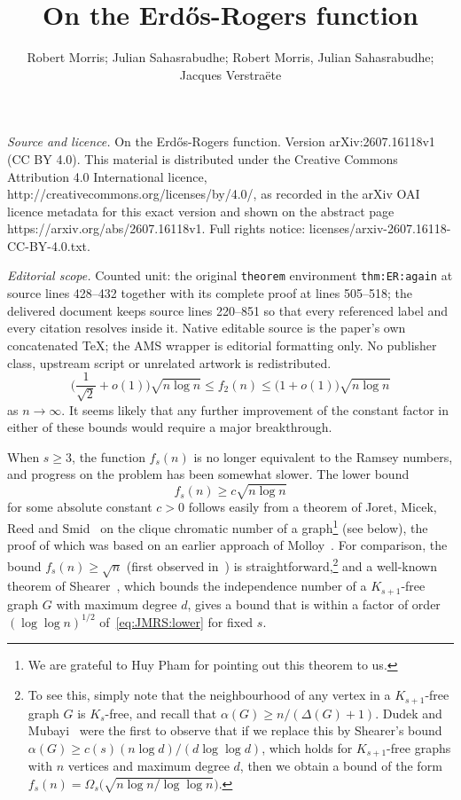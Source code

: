\documentclass[10pt,a4paper]{amsart}
\numberwithin{theorem}{section}
\renewcommand{\(}{\bigl(}
\renewcommand{\)}{\bigr)\vphantom{)}}
\renewcommand{\le}{\leqslant}
\renewcommand{\ge}{\geqslant}
\begin{document}
\title[On the ErdHos-Rogers function]{On the Erd\H{o}s-Rogers function}
\author{Robert Morris; Julian Sahasrabudhe; Robert Morris, Julian Sahasrabudhe; Jacques Verstraëte}
\date{}
\maketitle
\noindent\emph{Source and licence.} On the Erd\H{o}s-Rogers function. Version arXiv:2607.16118v1 (CC BY 4.0). This material is distributed under the Creative Commons Attribution 4.0 International licence, http://creativecommons.org/licenses/by/4.0/, as recorded in the arXiv OAI licence metadata for this exact version and shown on the abstract page https://arxiv.org/abs/2607.16118v1. Full rights notice: licenses/arxiv-2607.16118-CC-BY-4.0.txt.\par\smallskip
\noindent\textit{Editorial scope.} Counted unit: the original \texttt{theorem} environment \texttt{thm:ER:again} at source lines 428--432 together with its complete proof at lines 505--518; the delivered document keeps source lines 220--851 so that every referenced label and every citation resolves inside it. Native editable source is the paper's own concatenated TeX; the AMS wrapper is editorial formatting only. No publisher class, upstream script or unrelated artwork is redistributed.
\begin{equation}\label{eq:R3k:bounds}
\bigg( \frac{1}{\sqrt{2}} + o(1) \bigg) \sqrt{n \log n} \le f_2(n) \le \big( 1 + o(1) \big) \sqrt{n \log n}
\end{equation}
as $n \to \infty$. It seems likely that any further improvement of the constant factor in either of these bounds would require a major breakthrough. 

When $s \ge 3$, the function $f_s(n)$ is no longer equivalent to the Ramsey numbers, and progress on the problem has been somewhat slower. The lower bound 
\begin{equation}\label{eq:JMRS:lower}
f_s(n) \ge c \sqrt{n \log n}
\end{equation}
for some absolute constant $c  > 0$ follows easily from a theorem of Joret, Micek, Reed and Smid~\cite{JMRS21} on the clique chromatic number of a graph\footnote{We are grateful to Huy Pham for pointing out this theorem to us.} (see below), the proof of which was based on an earlier approach of Molloy~\cite{Mol19}. For comparison, the bound $f_s(n) \ge \sqrt{n}$ (first observed in~\cite{BH91}) is straightforward,\footnote{To see this, simply note that the neighbourhood of any vertex in a $K_{s+1}$-free graph $G$ is $K_s$-free, and recall that $\alpha(G) \ge n / (\Delta(G) + 1)$. Dudek and Mubayi~\cite{DM14} were the first to observe that if we replace this by Shearer's bound $\alpha(G) \ge c(s) (n \log d) / (d \log \log d)$, which holds for $K_{s+1}$-free graphs with $n$ vertices and maximum degree $d$, then we obtain a bound of the form $f_s(n) = \Omega_s\big( \displaystyle{\sqrt{ n \log n / \log\log n}} \big)$.} and a well-known theorem of Shearer~\cite{S95}, which bounds the independence number of a $K_{s+1}$-free graph $G$ with maximum degree $d$, gives a bound that is within a factor of order $(\log\log n)^{1/2}$ of~\eqref{eq:JMRS:lower} for fixed $s$.
\end{document}
